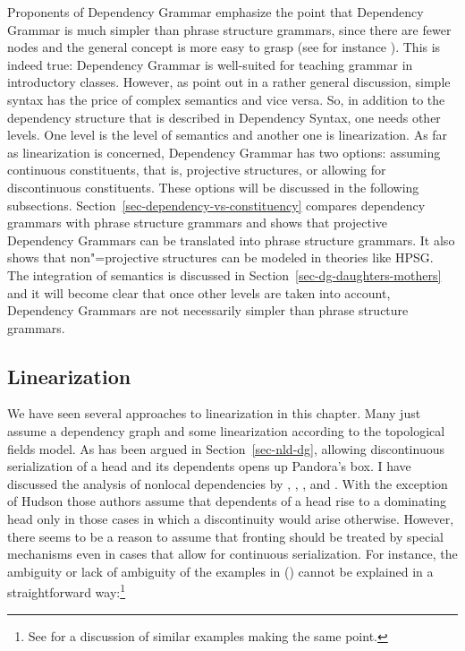 Proponents of Dependency Grammar emphasize the point that Dependency Grammar is much simpler than
phrase structure grammars, since there are fewer nodes and the general concept is more easy to
grasp (see for instance \citealp[Section~3.2, Section~7]{Osborne2014a-u}). This is indeed true: Dependency Grammar is well-suited for teaching grammar in
introductory classes. However, as \citet[]{SR2012a} point out in a rather general
discussion, simple syntax has the price of complex semantics and vice versa. So, in addition to
the dependency structure that is described in Dependency Syntax, one needs other levels. One level
is the level of semantics and another one is linearization. As far as linearization is concerned,
Dependency Grammar has two options: assuming continuous constituents, that is, projective structures,
or allowing for discontinuous constituents. These options will be discussed in the following subsections.
Section~\ref{sec-dependency-vs-constituency} compares dependency grammars with phrase structure
grammars and shows that projective Dependency Grammars can be translated into phrase structure
grammars. It also shows that non"=projective structures can be modeled in theories like HPSG.
The integration of semantics is discussed in Section~\ref{sec-dg-daughters-mothers} and it will become clear that once other
levels are taken into account, Dependency Grammars are not necessarily simpler than phrase structure grammars.


\subsection{Linearization}
\label{sec-linearization-problems-dg}
\label{sec-dg-multiple-frontings}

We have seen several approaches to linearization in this chapter. Many just assume a dependency
graph and some linearization according to the topological fields model. As has been argued in
Section~\ref{sec-nld-dg}, allowing discontinuous serialization of a head and its dependents opens up
Pandora's box. I have discussed the analysis of nonlocal dependencies by \citet{Kunze68a-u}, \citet{Hudson97a,Hudson2000a}, \citet*{KNR98a},
and \citet{GO2009a}.
With the exception of Hudson those authors assume that dependents of a head rise
to a dominating head only in those cases in which a discontinuity would arise otherwise. However, there
seems to be a reason to assume that fronting should be treated by special mechanisms even in cases
that allow for continuous serialization. For instance, the ambiguity or lack of ambiguity of the
examples in () cannot be explained in a straightforward way:\footnote{
  See  for a discussion of similar examples making the same point.
}

